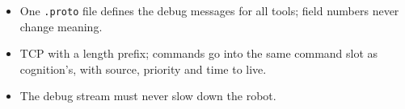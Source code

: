 \begin{keyidea}
\begin{itemize}[nosep]
  \item One \texttt{.proto} file defines the debug messages for all tools; field numbers never change meaning.
  \item TCP with a length prefix; commands go into the same command slot as cognition's, with source, priority and time to live.
  \item The debug stream must never slow down the robot.
\end{itemize}
\end{keyidea}
